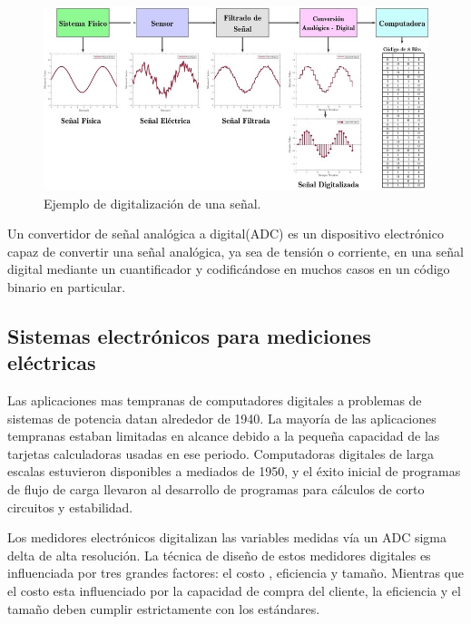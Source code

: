 \begin{figure}[h]
	\centering
	\includegraphics[width=120mm,keepaspectratio]{Figures/DigitalDAQ.jpg}
	\caption{Ejemplo de digitalización de una señal.}
	\label{fig:texmaker}
\end{figure}

Un convertidor de señal analógica a digital(ADC) es un dispositivo electrónico capaz de convertir una señal analógica, ya sea de tensión o corriente, en una señal digital mediante un cuantificador y codificándose en muchos casos en un código binario en particular. 

\subsection{Sistemas electrónicos para mediciones eléctricas}

Las aplicaciones mas tempranas de computadores digitales a problemas de sistemas de potencia datan alrededor de 1940. La mayoría de las aplicaciones tempranas estaban limitadas en alcance debido a la pequeña capacidad de las tarjetas calculadoras usadas en ese periodo. Computadoras digitales de larga escalas estuvieron disponibles a mediados de 1950, y el éxito inicial de programas de flujo de carga llevaron al desarrollo de programas para cálculos de corto circuitos y estabilidad.\citep{761852}

Los medidores electrónicos digitalizan las variables medidas vía un ADC sigma delta  de alta resolución. La técnica de diseño de estos medidores digitales es influenciada por tres grandes factores: el costo , eficiencia y tamaño. Mientras que el costo esta influenciado por la capacidad de compra del cliente, la eficiencia y el tamaño deben cumplir estrictamente con los estándares.\cite{articleDM}

